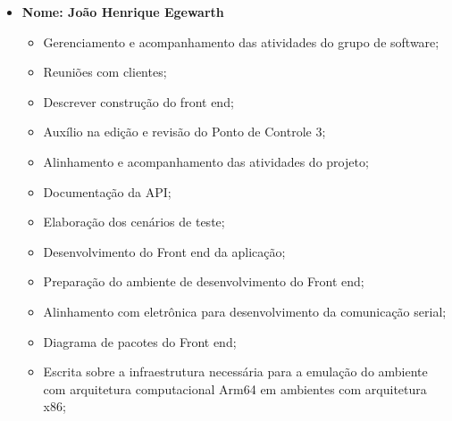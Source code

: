 \begin{itemize}
    
    \item \textbf{Nome: João Henrique Egewarth}
    \begin{itemize}
    \item Gerenciamento e acompanhamento das atividades do grupo de software;
    \item Reuniões com clientes;
    \item Descrever construção do front end;
    \item Auxílio na edição e revisão do Ponto de Controle 3;
    \item Alinhamento e acompanhamento das atividades do projeto;
    \item Documentação da API;
    \item Elaboração dos cenários de teste;
    \item Desenvolvimento do Front end da aplicação;
    \item Preparação do ambiente de desenvolvimento do Front end;
    \item Alinhamento com eletrônica para desenvolvimento da comunicação serial;
    \item Diagrama de pacotes do Front end;
    \item Escrita sobre a infraestrutura necessária para a emulação do ambiente com arquitetura computacional Arm64 em ambientes com arquitetura x86;
    \end{itemize}
    

\end{itemize}
